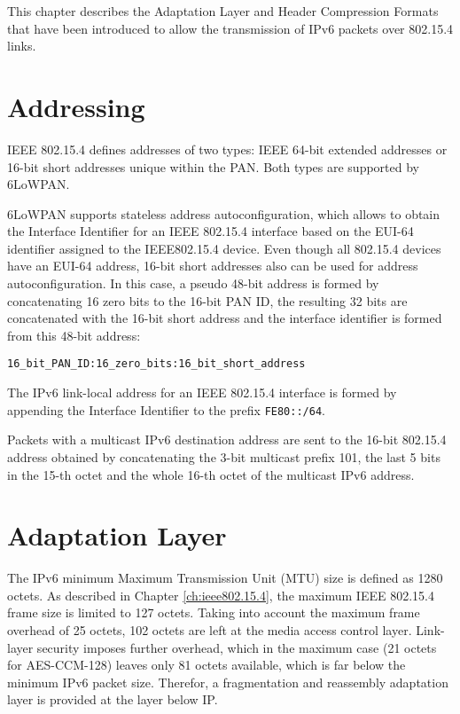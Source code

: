 \documentclass[12pt, titlepage, a4paper]{report}
\begin{document}
This chapter describes the Adaptation Layer and Header Compression Formats that have been introduced to allow the transmission of IPv6 packets over 802.15.4 links.

\section{Addressing}
IEEE 802.15.4 defines addresses of two types: IEEE 64-bit extended addresses or 16-bit short addresses unique within the PAN. Both types are supported by 6LoWPAN. 

6LoWPAN supports stateless address autoconfiguration, which allows to obtain the Interface Identifier \cite{rfc4291} for an IEEE 802.15.4 interface  based on the EUI-64 identifier \cite{eui64} \cite{rfc2464} assigned to the IEEE802.15.4 device. Even though all 802.15.4 devices have an EUI-64 address, 16-bit short addresses also can be used for address autoconfiguration.  In this case, a pseudo 48-bit address is formed by concatenating 16 zero bits to the 16-bit PAN ID, the resulting 32 bits are concatenated with the 16-bit short address and the interface identifier is formed from this 48-bit address:
\begin{center}\texttt{16\_bit\_PAN\_ID:16\_zero\_bits:16\_bit\_short\_address}\end{center}

The IPv6 link-local address for an IEEE 802.15.4 interface is formed by appending the Interface Identifier to the prefix \texttt{FE80::/64}.

Packets with a multicast IPv6 destination address are sent to the 16-bit 802.15.4 address obtained by concatenating the 3-bit multicast prefix 101, the last 5 bits in the 15-th octet and the whole 16-th octet of the multicast IPv6 address.

\section{Adaptation Layer}\label{sec:adapt.layer}
The IPv6 minimum Maximum Transmission Unit (MTU) size is defined as 1280 octets. As described in Chapter \ref{ch:ieee802.15.4}, the maximum IEEE 802.15.4 frame size is limited to 127 octets.  Taking into account the maximum frame overhead of 25 octets, 102 octets are left at the media access control layer. Link-layer security imposes further overhead, which in the maximum case (21 octets for AES-CCM-128) leaves only 81 octets available, which is far below the minimum IPv6 packet size. Therefor, a fragmentation and reassembly adaptation layer is provided at the layer below IP.
\end{document}
